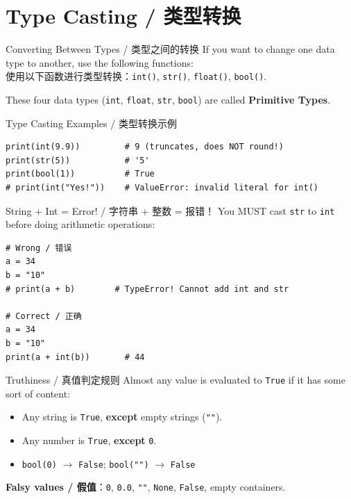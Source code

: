 \documentclass[11pt,a4paper]{article}
\begin{document}
\section{Type Casting / 类型转换}

\begin{concept}{Converting Between Types / 类型之间的转换}
    If you want to change one data type to another, use the following functions: \\
    使用以下函数进行类型转换：\texttt{int()}, \texttt{str()}, \texttt{float()}, \texttt{bool()}.

    These four data types (\texttt{int}, \texttt{float}, \texttt{str}, \texttt{bool}) are called \textbf{Primitive Types}.
\end{concept}

\begin{examplebox}{Type Casting Examples / 类型转换示例}
\begin{lstlisting}
print(int(9.9))         # 9 (truncates, does NOT round!)
print(str(5))           # '5'
print(bool(1))          # True
# print(int("Yes!"))    # ValueError: invalid literal for int()
\end{lstlisting}
\end{examplebox}

\begin{warning}{String + Int = Error! / 字符串 + 整数 = 报错！}
    You MUST cast \texttt{str} to \texttt{int} before doing arithmetic operations:
\begin{lstlisting}
# Wrong / 错误
a = 34
b = "10"
# print(a + b)        # TypeError! Cannot add int and str

# Correct / 正确
a = 34
b = "10"
print(a + int(b))       # 44
\end{lstlisting}
\end{warning}

\begin{concept}{Truthiness / 真值判定规则}
    Almost any value is evaluated to \texttt{True} if it has some sort of content:
    \begin{itemize}[itemsep=0.3em]
        \item Any string is \texttt{True}, \textbf{except} empty strings (\texttt{""}).
        \item Any number is \texttt{True}, \textbf{except} \texttt{0}.
        \item \texttt{bool(0)} $\rightarrow$ \texttt{False}; \texttt{bool("")} $\rightarrow$ \texttt{False}
    \end{itemize}
    \textbf{Falsy values / 假值}：\texttt{0}, \texttt{0.0}, \texttt{""}, \texttt{None}, \texttt{False}, empty containers.
\end{concept}
\end{document}
